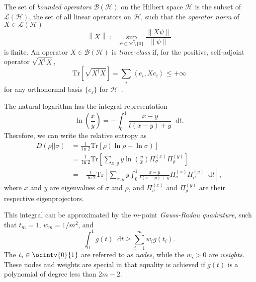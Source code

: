 \documentclass[10pt, a4paper]{article}
\numberwithin{equation}{section} %
\theoremstyle{definition}
\theoremstyle{plain}
\newcommand{\norm}[1]{\left\lVert#1\right\rVert}
\newcommand{\dif}{\mathop{}\!\mathrm{d}} %
\newcommand{\?}{\mathrel{?}} %
\newcommand{\angleb}[1]{\left\langle #1 \right\rangle} %
\newcommand{\Tr}{\mathrm{Tr}} %
\newcommand{\Hs}{\mathcal{H}} %
\begin{document}
    The set of \emph{bounded operators} \(\mathcal{B}(\Hs)\) on the Hilbert space \(\Hs\) is the subset of \(\mathcal{L}(\Hs)\), the set of all linear operators on \(\Hs\), such that the \emph{operator norm} of \(X \in \mathcal{L}(\Hs)\)
      \[ \norm{X} \coloneqq \sup_{\psi \in \Hs \setminus \{0\}} \frac{\norm{X\psi}}{\norm{\psi}} \]
      is finite. An operator \(X \in \mathcal{B}(\Hs)\) is \emph{trace-class} if, for the positive, self-adjoint operator \(\sqrt{X^{\dagger}X}\),
      \[ \Tr\left[ \sqrt{X^{\dagger}X} \right] = \sum_{i} \angleb{e_i, Xe_i} \leq +\infty \]
      for any orthonormal basis \(\{e_j\}\) for \(\Hs\)~\cite{HallQuantumForMath}. 

      The natural logarithm has the integral representation
      \begin{equation}
        \ln\left(\frac{x}{y}\right) = -\int_{0}^{1} \frac{x-y}{t(x-y) + y} \dif{t}.
      \end{equation}
      Therefore, we can write the relative entropy as
      \begin{align}
        D(\rho||\sigma) &= \frac{1}{\ln 2} \Tr\left[\rho \left(\ln\rho - \ln\sigma\right) \right] \\
                        &= \frac{1}{\ln 2} \Tr\left[ \sum_{x,y} y \ln\left(\frac{y}{x}\right) \Pi^{(x)}_{\sigma} \Pi^{(y)}_{\rho}  \right]\label{eqn:finitedim_relent} \\ 
                        &= -\frac{1}{\ln 2} \Tr\left[ \sum_{x,y} y \int_{0}^{1} \frac{x-y}{t(x-y)+y} \Pi^{(x)}_{\sigma} \Pi^{(y)}_{\rho} \dif{t} \right],
      \end{align}
      where \(x\) and \(y\) are eigenvalues of \(\sigma\) and \(\rho\), and \(\Pi^{(x)}_{\sigma}\) and \(\Pi^{(y)}_{\rho}\) are their respective eigenprojectors.

      This integral can be approximated by the \(m\)-point \emph{Gauss-Radau quadrature}, such that \(t_m = 1\), \(w_m = 1/m^2\), and
      \begin{equation}
        \int_{0}^{1} g(t) \dif{t} \geq \sum_{i=1}^m w_i g(t_i).
      \end{equation}
      The \(t_i \in \ocintv{0}{1}\) are referred to as \emph{nodes}, while the \(w_i > 0\) are \emph{weights}. These nodes and weights are special in that equality is achieved if \(g(t)\) is a polynomial of degree less than \(2m-2\).
\end{document}
